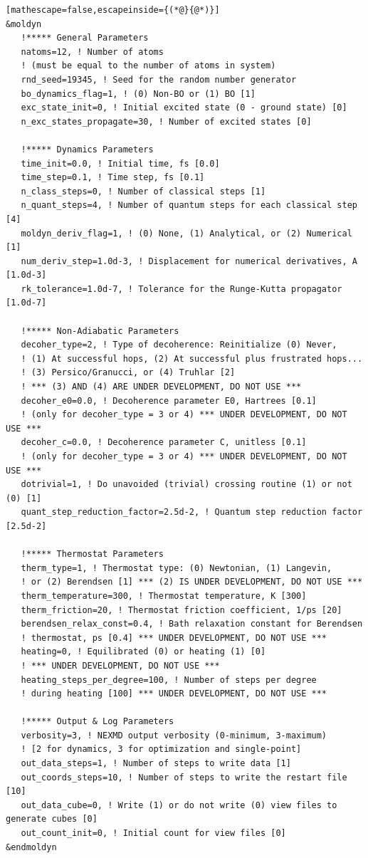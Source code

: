 \documentclass[letterpaper,12pt,titlepage]{article}
\begin{document}
\begin{appendix}
\begin{lstlisting}[mathescape=false,escapeinside={(*@}{@*)}]
&moldyn
   !***** General Parameters
   natoms=12, ! Number of atoms 
   ! (must be equal to the number of atoms in system)
   rnd_seed=19345, ! Seed for the random number generator
   bo_dynamics_flag=1, ! (0) Non-BO or (1) BO [1]
   exc_state_init=0, ! Initial excited state (0 - ground state) [0]
   n_exc_states_propagate=30, ! Number of excited states [0]

   !***** Dynamics Parameters
   time_init=0.0, ! Initial time, fs [0.0]
   time_step=0.1, ! Time step, fs [0.1]
   n_class_steps=0, ! Number of classical steps [1]
   n_quant_steps=4, ! Number of quantum steps for each classical step [4]
   moldyn_deriv_flag=1, ! (0) None, (1) Analytical, or (2) Numerical [1]
   num_deriv_step=1.0d-3, ! Displacement for numerical derivatives, A [1.0d-3]
   rk_tolerance=1.0d-7, ! Tolerance for the Runge-Kutta propagator [1.0d-7]

   !***** Non-Adiabatic Parameters
   decoher_type=2, ! Type of decoherence: Reinitialize (0) Never, 
   ! (1) At successful hops, (2) At successful plus frustrated hops... 
   ! (3) Persico/Granucci, or (4) Truhlar [2]
   ! *** (3) AND (4) ARE UNDER DEVELOPMENT, DO NOT USE ***
   decoher_e0=0.0, ! Decoherence parameter E0, Hartrees [0.1]
   ! (only for decoher_type = 3 or 4) *** UNDER DEVELOPMENT, DO NOT USE ***
   decoher_c=0.0, ! Decoherence parameter C, unitless [0.1]
   ! (only for decoher_type = 3 or 4) *** UNDER DEVELOPMENT, DO NOT USE ***
   dotrivial=1, ! Do unavoided (trivial) crossing routine (1) or not (0) [1]
   quant_step_reduction_factor=2.5d-2, ! Quantum step reduction factor [2.5d-2]

   !***** Thermostat Parameters
   therm_type=1, ! Thermostat type: (0) Newtonian, (1) Langevin, 
   ! or (2) Berendsen [1] *** (2) IS UNDER DEVELOPMENT, DO NOT USE ***
   therm_temperature=300, ! Thermostat temperature, K [300]
   therm_friction=20, ! Thermostat friction coefficient, 1/ps [20]
   berendsen_relax_const=0.4, ! Bath relaxation constant for Berendsen 
   ! thermostat, ps [0.4] *** UNDER DEVELOPMENT, DO NOT USE ***
   heating=0, ! Equilibrated (0) or heating (1) [0]
   ! *** UNDER DEVELOPMENT, DO NOT USE ***
   heating_steps_per_degree=100, ! Number of steps per degree
   ! during heating [100] *** UNDER DEVELOPMENT, DO NOT USE ***

   !***** Output & Log Parameters
   verbosity=3, ! NEXMD output verbosity (0-minimum, 3-maximum)
   ! [2 for dynamics, 3 for optimization and single-point]
   out_data_steps=1, ! Number of steps to write data [1]
   out_coords_steps=10, ! Number of steps to write the restart file [10]
   out_data_cube=0, ! Write (1) or do not write (0) view files to generate cubes [0]
   out_count_init=0, ! Initial count for view files [0]
&endmoldyn


\end{lstlisting}
\end{appendix}
\end{document}
